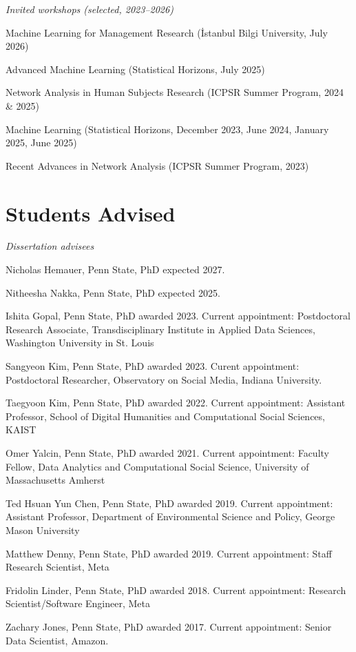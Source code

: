 \documentclass[overlapped,line]{res}
\begin{document}
\begin{resume}
\hspace{-1cm} \emph{Invited workshops (selected, 2023--2026)}
\begin{etaremune}
\item Machine Learning for Management Research (İstanbul Bilgi University, July 2026)
\item Advanced Machine Learning (Statistical Horizons, July 2025)
\item Network Analysis in Human Subjects Research (ICPSR Summer Program, 2024 \& 2025)
\item Machine Learning (Statistical Horizons, December 2023, June 2024, January 2025, June 2025)
\item Recent Advances in Network Analysis (ICPSR Summer Program, 2023)
\end{etaremune}

\section{\bf Students Advised}
\vspace{.1cm}
\hspace{-1cm} \emph{Dissertation advisees}
\begin{etaremune}
\item Nicholas Hemauer, Penn State, PhD expected 2027.
\item Nitheesha Nakka, Penn State, PhD expected 2025.
\item Ishita Gopal, Penn State, PhD awarded 2023. Current appointment: Postdoctoral Research Associate, Transdisciplinary Institute in Applied Data Sciences, Washington University in St. Louis 
\item Sangyeon Kim, Penn State, PhD awarded 2023. Curent appointment:  Postdoctoral Researcher, Observatory on Social Media, Indiana University.
\item Taegyoon Kim, Penn State, PhD awarded 2022. Current appointment: Assistant Professor, School of Digital Humanities and Computational Social Sciences, KAIST
\item Omer Yalcin, Penn State, PhD awarded 2021. Current appointment: Faculty Fellow, Data Analytics and Computational Social Science, University of Massachusetts Amherst
\item Ted Hsuan Yun Chen, Penn State, PhD awarded 2019. Current appointment:  Assistant Professor, Department of Environmental Science and Policy, George Mason University
\item Matthew Denny, Penn State, PhD awarded 2019. Current appointment:  Staff Research Scientist, Meta
\item Fridolin Linder, Penn State, PhD awarded 2018. Current appointment: Research Scientist/Software Engineer, Meta
\item Zachary Jones, Penn State, PhD awarded 2017. Current appointment:  Senior Data Scientist, Amazon.


\end{etaremune}
\end{resume}
\end{document}
